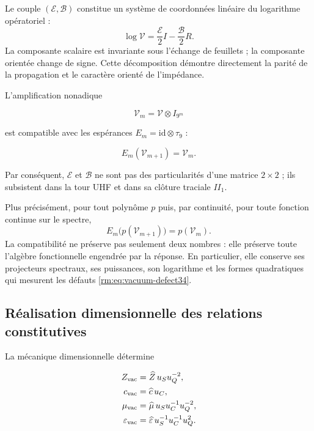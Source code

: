 Le couple \((\mathcal E,\mathcal B)\) constitue un système de coordonnées linéaire du logarithme
opératoriel :
\begin{equation}
\log\mathcal V
=\frac{\mathcal E}{2}I-\frac{\mathcal B}{2}R.
\label{rm:eq:vacuum-log-decomposition}
\end{equation}
La composante scalaire est invariante sous l'échange de feuillets ; la
composante orientée change de signe. Cette décomposition démontre
directement la parité de la propagation et le caractère orienté de
l'impédance.

L'amplification nonadique

\[
\mathcal V_m=\mathcal V\otimes I_{9^m}
\]

est compatible avec les espérances \(E_m=\mathrm{id}\otimes\tau_9\) :

\[
E_m(\mathcal V_{m+1})=\mathcal V_m.
\]

Par conséquent, \(\mathcal E\) et \(\mathcal B\) ne sont pas des particularités d'une matrice \(2\times2\) ; ils subsistent dans la tour UHF et dans sa clôture traciale \(II_1\).

Plus précisément, pour tout polynôme \(p\) puis, par continuité,
pour toute fonction continue sur le spectre,
\begin{equation}
E_m\bigl(p(\mathcal V_{m+1})\bigr)=p(\mathcal V_m).
\label{rm:eq:vacuum-functional-refinement}
\end{equation}
La compatibilité ne préserve pas seulement deux nombres : elle préserve toute
l'algèbre fonctionnelle engendrée par la réponse. En particulier, elle conserve ses
projecteurs spectraux, ses puissances, son logarithme et les formes quadratiques
qui mesurent les défauts \cref{rm:eq:vacuum-defect34}.

\subsection{Réalisation dimensionnelle des relations constitutives}

La mécanique dimensionnelle détermine

\begin{align}
Z_{\rm vac}&=\widehat Z\,u_Su_Q^{-2},\\
c_{\rm vac}&=\widehat c\,u_C,\\
\mu_{\rm vac}&=\widehat\mu\,u_Su_C^{-1}u_Q^{-2},\\
\varepsilon_{\rm vac}&=\widehat\varepsilon\,u_S^{-1}u_C^{-1}u_Q^2.
\label{rm:eq:vacuum-sections}
\end{align}

